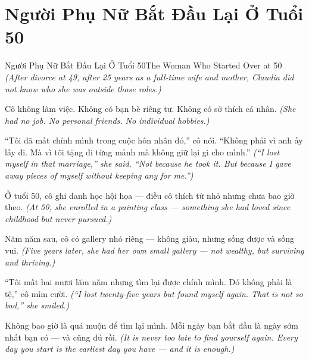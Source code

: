\section{Người Phụ Nữ Bắt Đầu Lại Ở Tuổi 50}
\begin{truyen}{Người Phụ Nữ Bắt Đầu Lại Ở Tuổi 50}{The Woman Who Started Over at 50}
\textit{(After divorce at 49, after 25 years as a full-time wife and mother, Claudia did not know who she was outside those roles.)}

Cô không làm việc. Không có bạn bè riêng tư. Không có sở thích cá nhân.
\textit{(She had no job. No personal friends. No individual hobbies.)}

``Tôi đã mất chính mình trong cuộc hôn nhân đó,'' cô nói. ``Không phải vì anh ấy lấy đi. Mà vì tôi tặng đi từng mảnh mà không giữ lại gì cho mình.''
\textit{(``I lost myself in that marriage,'' she said. ``Not because he took it. But because I gave away pieces of myself without keeping any for me.'')}

Ở tuổi 50, cô ghi danh học hội họa — điều cô thích từ nhỏ nhưng chưa bao giờ theo.
\textit{(At 50, she enrolled in a painting class — something she had loved since childhood but never pursued.)}

Năm năm sau, cô có gallery nhỏ riêng — không giàu, nhưng sống được và sống vui.
\textit{(Five years later, she had her own small gallery — not wealthy, but surviving and thriving.)}

``Tôi mất hai mươi lăm năm nhưng tìm lại được chính mình. Đó không phải là tệ,'' cô mỉm cười.
\textit{(``I lost twenty-five years but found myself again. That is not so bad,'' she smiled.)}

\end{truyen}

\begin{baihoc}
Không bao giờ là quá muộn để tìm lại mình. Mỗi ngày bạn bắt đầu là ngày sớm nhất bạn có — và cũng đủ rồi.
\textit{(It is never too late to find yourself again. Every day you start is the earliest day you have — and it is enough.)}
\end{baihoc}
\ngancach

